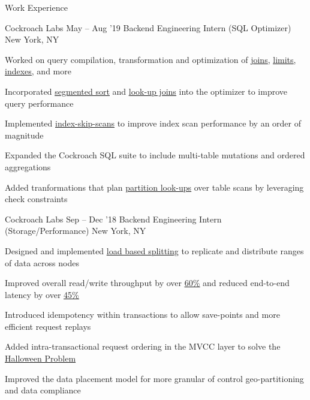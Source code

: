 \documentclass{resume} %
\begin{document}
\begin{rSection}{Work Experience}
  \begin{rSubsection}{Cockroach Labs}
    {May -- Aug '19}
         {Backend Engineering Intern (SQL Optimizer)}
         {New York, NY}
       \item Worked on query compilation, transformation and
         optimization of
         \setul{4pt}{.4pt}
         \href{https://github.com/cockroachdb/cockroach/pull/38285}{\ul{joins}},
         \href{https://github.com/cockroachdb/cockroach/pull/38660}{\ul{limits}}, 
         \href{https://github.com/cockroachdb/cockroach/pull/37616}{\ul{indexes}}, 
         and more
       \item Incorporated 
         \href{https://github.com/cockroachdb/cockroach/pull/38452}{\underline{segmented
             sort}}
         and 
         \href{https://github.com/cockroachdb/cockroach/pull/38285}{\underline{look-up
             joins}} into the optimizer
         to improve query performance
       \item Implemented
         \href{https://github.com/cockroachdb/cockroach/pull/39668}{\ul{index-skip-scans}}
         to improve index scan performance by an order of magnitude
       \item Expanded the Cockroach SQL suite to include multi-table mutations
         and ordered aggregations
       \item Added tranformations that plan 
         \href{https://github.com/cockroachdb/cockroach/pull/38963}{\underline{partition look-ups}}
         over table scans by leveraging check constraints
  \end{rSubsection}

  \begin{rSubsection}{Cockroach Labs}
    {Sep -- Dec '18}
         {Backend Engineering Intern (Storage/Performance)}
         {New York, NY}
       \item Designed and implemented \href{https://github.com/cockroachdb/cockroach/pull/31413}
      {\underline{load based splitting}} to replicate
      and distribute ranges of data across nodes
    \item Improved overall read/write throughput by over
         \href{https://github.com/cockroachdb/cockroach/issues/31819}{\underline{60\%}}
         and reduced end-to-end latency by over
         \href{https://github.com/cockroachdb/cockroach/issues/31819}{\underline{45\%}}
       \item Introduced
         idempotency within transactions to allow
         save-points and more efficient request replays
       \item Added intra-transactional request
           ordering in the MVCC layer to solve the 
         \href{https://github.com/cockroachdb/cockroach/pull/33244}{\underline{Halloween
             Problem}}
       \item Improved the data placement
         model for more granular of control geo-partitioning and data compliance
  \end{rSubsection}


\end{rSection}
\end{document}
